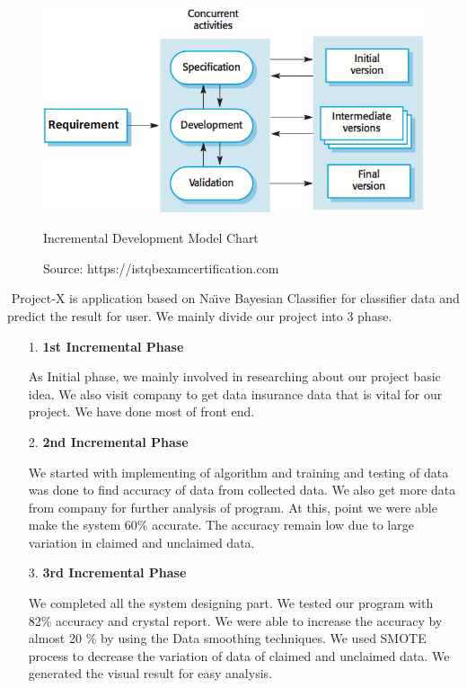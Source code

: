 \begin{figure}[tbh] %
\begin{center}
	\includegraphics[width = 5in]{images/sdlc.png}
	\caption{Incremental Development Model Chart} %
	\caption*{Source: https://istqbexamcertification.com}
	\label{Incremental Development Model Chart} %
\end{center}
\end{figure}
\par 
$  $
Project-X is application based on Na\"{\i}ve Bayesian Classifier for classifier data and predict the result for user.
We mainly divide our project into 3 phase.
\begin{enumerate}
	\item[1.] \textbf{1st Incremental Phase}
	\par
	As Initial phase, we mainly involved in researching about our project basic idea. We also visit company to get data insurance data that is vital for  our project. We have done most of front end. 
	 \item[2.] \textbf{2nd Incremental Phase}
	 \par 
	 We started with implementing of algorithm and training and testing of data was done to find accuracy of data from collected data. We also get more data from company for further analysis of program. At this, point we were able make the system 60\% accurate. The accuracy remain low due to large variation in claimed and unclaimed data.
	
	 \item[3.] \textbf{3rd Incremental Phase}
	 \par 
	 We completed all the system designing part. We tested our program with 82\% accuracy and crystal report. We were able to increase the accuracy by almost 20 \% by using the Data smoothing techniques.
 We used SMOTE process to decrease the variation of data of claimed and unclaimed data. We generated the visual result for easy analysis.
 
\end{enumerate}








